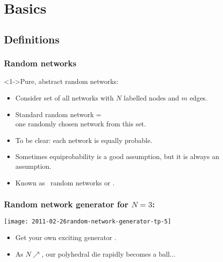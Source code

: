 \section{Basics}

\subsection{Definitions}

\begin{frame}[label=]
  \frametitle{Random networks}
  
  \begin{block}<1->{Pure, abstract random networks:}
    \begin{itemize}
    \item<2->
      Consider set of all networks with $N$ labelled nodes
      and $m$ edges.
    \item<3-> 
      Standard random network = \\
      one \alert{randomly chosen} network from this set.
    \item<4-> 
      To be clear: each network is \alert{equally} probable.
    \item<5-> 
      Sometimes equiprobability is a good assumption, but
      it is always an assumption.
    \item<6-> 
      Known as \erdosrenyi\ random networks 
      or .
    \end{itemize}
  \end{block}
  
\end{frame}

\begin{frame}[label=]
  \frametitle{Random network generator for $N=3$:}

  \texttt{[image: 2011-02-26random-network-generator-tp-5]}

  \begin{itemize}
  \item 
    Get your own exciting generator
    .
  \item 
    As $N \nearrow$, our polyhedral die rapidly becomes a ball...
  \end{itemize}

\end{frame}


